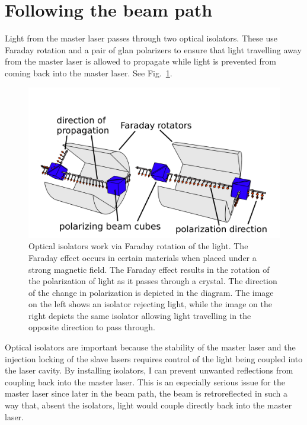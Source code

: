 \section{Following the beam path}
Light from the master laser passes through two optical isolators. These use Faraday rotation and a pair of glan polarizers to ensure that light travelling away from the master laser is allowed to propagate while light is prevented from coming back into the master laser. See Fig.~\ref{isolatorPicture}.

\begin{figure}
\centerline{\includegraphics[width=1\textwidth]{isolators}}
\caption[Optical isolator illustration]{\label{isolatorPicture} Optical isolators work via Faraday rotation of the light. The Faraday effect occurs in certain materials when placed under a strong magnetic field. The Faraday effect results in the rotation of the polarization of light as it passes through a crystal. The direction of the change in polarization is depicted in the diagram. The image on the left shows an isolator rejecting light, while the image on the right depicts the same isolator allowing light travelling in the opposite direction to pass through.}
\end{figure}

Optical isolators are important because the stability of the master laser and the injection locking of the slave lasers requires control of the light being coupled into the laser cavity. By installing isolators, I can prevent unwanted reflections from coupling back into the master laser. This is an especially serious issue for the master laser since later in the beam path, the beam is retroreflected in such a way that, absent the isolators, light would couple directly back into the master laser. 

